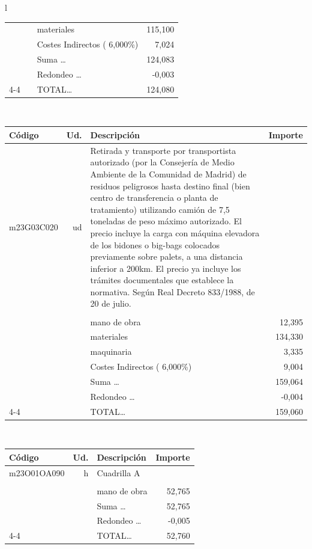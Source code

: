 \documentclass{book}%
\begin{document}
\begin{longtable}{l}
\begin{tabular}{l r p{60mm} r}
&&materiales&   115,100\\%
&&Costes Indirectos (     6,000\%)&     7,024\\%
&&Suma \ldots&   124,083\\%
&&Redondeo \ldots&    {-}0,003\\%
\cline{4-4}%
&&TOTAL\ldots&   124,080\\%
\end{tabular}\\%
\begin{tabular}{l r p{60mm} r}%
Código&Ud.&Descripción&Importe\\%
\hline%
m23G03C020&ud&Retirada y transporte por transportista autorizado (por la Consejería de Medio Ambiente de la Comunidad de Madrid) de residuos peligrosos hasta destino final (bien centro de transferencia o planta de tratamiento) utilizando camión de 7,5 toneladas de peso máximo autorizado. El precio incluye la carga con máquina elevadora de los bidones o big{-}bags colocados previamente sobre palets, a una distancia inferior a 200km. El precio ya incluye los trámites documentales que establece la normativa. Según Real Decreto 833/1988, de 20 de julio.&\\%
&&&\\%
&&mano de obra&    12,395\\%
&&materiales&   134,330\\%
&&maquinaria&     3,335\\%
&&Costes Indirectos (     6,000\%)&     9,004\\%
&&Suma \ldots&   159,064\\%
&&Redondeo \ldots&    {-}0,004\\%
\cline{4-4}%
&&TOTAL\ldots&   159,060\\%
\end{tabular}\\%
\begin{tabular}{l r p{60mm} r}%
Código&Ud.&Descripción&Importe\\%
\hline%
m23O01OA090&h&Cuadrilla A&\\%
&&&\\%
&&mano de obra&    52,765\\%
&&Suma \ldots&    52,765\\%
&&Redondeo \ldots&    {-}0,005\\%
\cline{4-4}%
&&TOTAL\ldots&    52,760\\%
\end{tabular}\\%
\begin{tabular}{l r p{60mm} r}%

\end{tabular}
\end{longtable}
\end{document}
